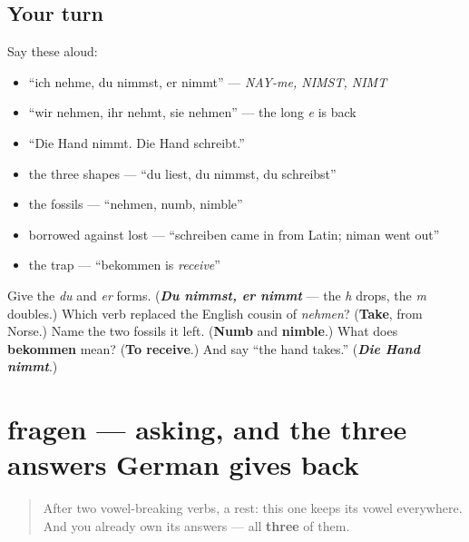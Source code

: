 \subsection*{Your turn}
Say these aloud:

\begin{itemize}
\raggedright
  \item \textquotedblleft{}ich nehme, du nimmst, er nimmt\textquotedblright{} — \emph{NAY-me, NIMST, NIMT}
  \item \textquotedblleft{}wir nehmen, ihr nehmt, sie nehmen\textquotedblright{} — the long \emph{e} is back
  \item \textquotedblleft{}Die Hand nimmt. Die Hand schreibt.\textquotedblright{}
  \item the three shapes — \textquotedblleft{}du liest, du nimmst, du schreibst\textquotedblright{}
  \item the fossils — \textquotedblleft{}nehmen, numb, nimble\textquotedblright{}
  \item borrowed against lost — \textquotedblleft{}schreiben came in from Latin; niman went out\textquotedblright{}
  \item the trap — \textquotedblleft{}bekommen is \emph{receive}\textquotedblright{}
\end{itemize}

\begin{tcolorbox}[breakable,colback=teal!4,colframe=teal!35!black,title={Before you move on}]
Give the \emph{du} and \emph{er} forms. (\emph{\textbf{Du nimmst, er nimmt}} — the \emph{h} drops, the \emph{m} doubles.) Which verb replaced the English cousin of \emph{nehmen}? (\textbf{Take}, from Norse.) Name the two fossils it left. (\textbf{Numb} and \textbf{nimble}.) What does \textbf{bekommen} mean? (\textbf{To receive}.) And say \textquotedblleft{}the hand takes.\textquotedblright{} (\emph{\textbf{Die Hand nimmt}}.)
\end{tcolorbox}
\section[fragen]{fragen — asking, and the three answers German gives back}

\label{lesson:GE-C25-fragen}



\begin{quote}
After two vowel-breaking verbs, a rest: this one keeps its vowel everywhere. And you already own its answers — all \textbf{three} of them.
\end{quote}


